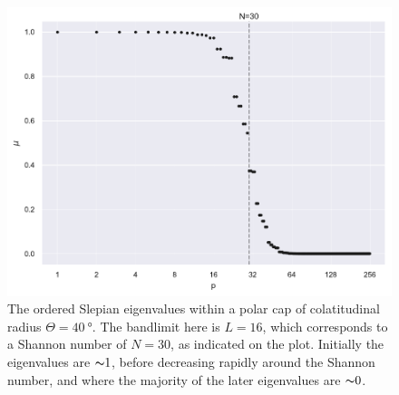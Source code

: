 \begin{figure}[htpb]
	\centering\capstart{}
	\includegraphics[width=\textwidth]{polar_cap_eigenvalues.pdf}
	\caption[
		The Slepian eigenvalues within a \(\SI{40}{\degree}\) polar cap
	]{
		The ordered Slepian eigenvalues within a polar cap of colatitudinal radius \(\Theta=\SI{40}{\degree}\).
		The bandlimit here is  \(L=16\), which corresponds to a Shannon number of \(N=30\), as indicated on the plot.
		Initially the eigenvalues are \({\thicksim}1\), before decreasing rapidly around the Shannon number, and where the majority of the later eigenvalues are \({\thicksim}0\).
	}\label{fig:chapter2_polar_cap_eigenvalues}
\end{figure}
